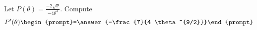 \documentclass{ximera}
\author{Bart Snapp}
\begin{document}
\begin{exercise}
Let $P(\theta) = \frac{ -2 \sqrt{\theta }}{-4 \theta ^4}$. Compute
\[
P'(\theta)
\begin{prompt}=\answer{-\frac{7}{4 \theta ^{9/2}}}\end{prompt}
\]
\end{exercise}
\end{document}
